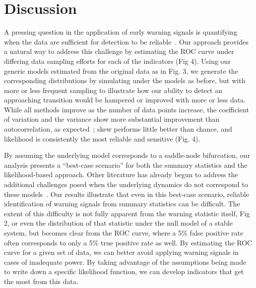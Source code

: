 \documentclass[authoryear,preprint,11pt]{elsarticle}
\begin{document}

\section{Discussion}
A pressing question in the application of early warning signals is quantifying
when the data are sufficient for detection to be reliable~\citep{Scheffer2009, Scheffer2010, Inman2011}. 
Our approach provides a natural way to address this challenge by estimating the ROC curve under differing data sampling efforts
for each of the indicators (Fig 4). 
Using our generic models estimated from the original data as in Fig. 3, 
we generate the corresponding distributions by simulating under the models as before, 
but with more or less frequent sampling to illustrate how our ability to detect an approaching transition 
would be hampered or improved with more or less data.  
While all methods improve as the number of data points increase, 
the coefficient of variation and the variance show more substantial improvement than autocorrelation, 
as expected~\citep{Carpenter2011};⁠
skew performs little better than chance, and likelihood is consistently the most reliable and sensitive (Fig. 4). 

By assuming the underlying model corresponds to a saddle-node bifurcation,
our analysis presents a ``best-case scenario'' for both the summary statistics and the likelihood-based approach. 
Other literature has already begun to address the additional challenges posed when the underlying 
dynamics do not correspond to these models~\citep{Hastings2010}.
Our results illustrate that even in this best-case scenario, 
reliable identification of warning signals from summary statistics can be difficult.  
The extent of this difficulty is not fully apparent from the warning statistic itself, Fig 2,
or even the distribution of that statistic under the null model of a stable system, 
but becomes clear from the ROC curve, where a 5\% false positive rate often corresponds to only a 5\% true positive rate as well.  
By estimating the ROC curve for a given set of data, 
we can better avoid applying warning signals in cases of inadequate power.
By taking advantage of the assumptions being made to write down a specific likelihood function,
we can develop indicators that get the most from this data.  
\end{document}
